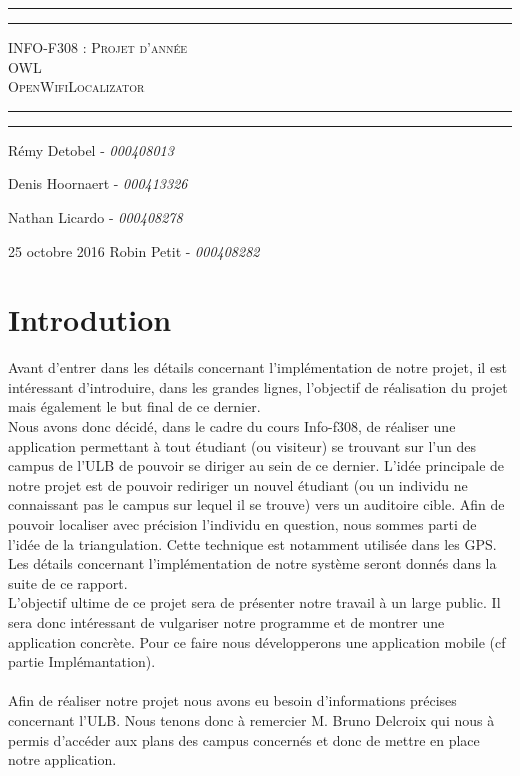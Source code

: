 \documentclass[11pt,a4paper]{article}
\title{}
\author{}
\begin{document}
\begin{center}
    \vspace*{\fill}
        \hrule
        \vspace*{2pt}
        \hrule
        \vspace*{15pt}
        \textsc{\Huge{INFO-F308 : Projet d'année \\\vspace*{8pt}
            OWL\\\vspace*{12pt}
            OpenWifiLocalizator}}
        \vspace*{15pt}
        \hrule
        \vspace*{2pt}
        \hrule
  \vspace*{\fill}
\end{center}
\null
\vfill

\large
\hfill Rémy Detobel - \emph{000408013}

\hfill Denis Hoornaert - \emph{000413326}

\hfill Nathan Licardo - \emph{000408278}

25 octobre 2016 \hfill Robin Petit - \emph{000408282}
\newpage

\tableofcontents

\newpage

\section{Introdution}
Avant d'entrer dans les détails concernant l'implémentation de notre projet, il est intéressant d'introduire, dans les grandes lignes, l'objectif de réalisation du projet mais également le but final de ce dernier.\\
Nous avons donc décidé, dans le cadre du cours Info-f308, de réaliser une application permettant à tout étudiant (ou visiteur) se trouvant sur l'un des campus de l'ULB de pouvoir se diriger au sein de ce dernier. L'idée principale de notre projet est de pouvoir rediriger un nouvel étudiant (ou un individu ne connaissant pas le campus sur lequel il se trouve) vers un auditoire cible. Afin de pouvoir localiser avec précision l'individu en question, nous sommes parti de l'idée de la triangulation. Cette technique est notamment utilisée dans les GPS. Les détails concernant l'implémentation de notre système seront donnés dans la suite de ce rapport.\\
L'objectif ultime de ce projet sera de présenter notre travail à un large public. Il sera donc intéressant de \og vulgariser \fg{} notre programme et de montrer une application concrète. Pour ce faire nous développerons une application mobile (cf partie Implémantation).\\\\
Afin de réaliser notre projet nous avons eu besoin d'informations précises concernant l'ULB. Nous tenons donc à remercier M. Bruno Delcroix qui nous à permis d'accéder aux plans des campus concernés et donc de mettre en place notre application.
\end{document}
